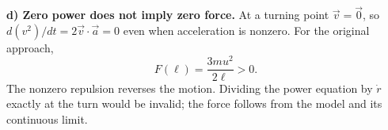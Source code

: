 \documentclass[11pt,a4paper]{article}
\begin{document}
\textbf{d) Zero power does not imply zero force.}
At a turning point $\vec v=\vec0$, so $d(v^2)/dt=2\vec v\cdot\vec a=0$
even when acceleration is nonzero. For the original approach,
\[
\boxed{F(\ell)=\frac{3mu^2}{2\ell}>0.}
\]
The nonzero repulsion reverses the motion. Dividing the power equation by
$\dot r$ exactly at the turn would be invalid; the force follows from the
model and its continuous limit.

\end{document}
